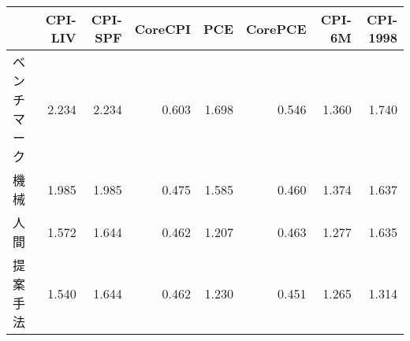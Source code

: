 \begin{tabular}{lrrrrrrr}
\toprule
{} &  CPI-LIV &  CPI-SPF &  CoreCPI &    PCE &  CorePCE &  CPI-6M &  CPI-1998 \\
\midrule
ベンチマーク&    2.234 &    2.234 &    0.603 &  1.698 &    0.546 &   1.360 &     1.740 \\
機械      &    1.985 &    1.985 &    0.475 &  1.585 &    0.460 &   1.374 &     1.637 \\
人間      &    1.572 &\alert{1.644}&\alert{0.462}&\alert{1.207}&    0.463 &   1.277 &     1.635 \\
提案手法   &\alert{1.540}&\alert{1.644}&\alert{0.462}&  1.230 &\alert{0.451}&\alert{1.265}&\alert{1.314} \\
\bottomrule
\end{tabular}
